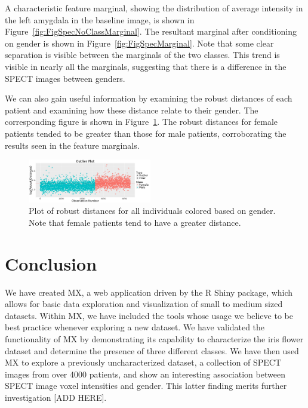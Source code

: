\documentclass[twoside,leqno,twocolumn]{article}
\begin{document}
A characteristic feature marginal, showing the distribution of average intensity in the left amygdala in the baseline image, is shown in Figure~\ref{fig:FigSpecNoClassMarginal}. The resultant marginal after conditioning on gender is shown in Figure~\ref{fig:FigSpecMarginal}. Note that some clear separation is visible between the marginals of the two classes. This trend is visible in nearly all the marginals, suggesting that there is a difference in the SPECT images between genders.

We can also gain useful information by examining the robust distances of each patient and examining how these distance relate to their gender. The corresponding figure is shown in Figure~\ref{fig:FigSpecOutlierPlot}. The robust distances for female patients tended to be greater than those for male patients, corroborating the results seen in the feature marginals.

\begin{figure}[t]
	\centering
	\includegraphics[width=0.48\textwidth,valign=t]{Figures/Spect_Gender/OutlierPlot.png}
	\caption{Plot of robust distances for all individuals colored based on gender. Note that female patients tend to have a greater distance.}
	\label{fig:FigSpecOutlierPlot}
\end{figure}

\section{Conclusion}
\label{sec:conc}

We have created MX, a web application driven by the R Shiny package, which allows for basic data exploration and visualization of small to medium sized datasets. Within MX, we have included the tools whose usage we believe to be best practice whenever exploring a new dataset. We have validated the functionality of MX by demonstrating its capability to characterize the iris flower dataset and determine the presence of three different classes. We have then used MX to explore a previously uncharacterized dataset, a collection of SPECT images from over 4000 patients, and show an interesting association between SPECT image voxel intensities and gender. This latter finding merits further investigation [ADD HERE].
\end{document}
